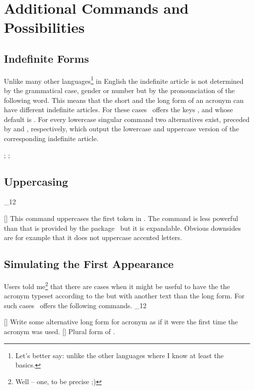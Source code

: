 \documentclass[load-preamble+,scrartcl={DIV10}]{cnltx-doc}
\makeatletter
\renewenvironment{commands}
  {%
    \cnltx@set@catcode_{12}%
    \let\command\cnltx@command
    \cnltxlist
  }
  {\endcnltxlist}
\makeatother
\begin{document}
\section{Additional Commands and Possibilities}
\subsection{Indefinite Forms}
\noindent{}%
Unlike many other languages\footnote{Let's better say: unlike the other
  languages where I know at least the basics.} in English the indefinite
article is not determined by the grammatical case, gender or number but by the
pronounciation of the following word.  This means that the short and the long
form of an acronym can have different indefinite articles.  For these cases
\acro\ offers the keys ,  and
 whose default is .  For every lowercase
singular command two alternatives exist, preceded by  and ,
respectively, which output the lowercase and uppercase version of the
corresponding indefinite article.

\begin{example}
  ; ; 
\end{example}

\subsection{Uppercasing}
\begin{commands}
  \command{acfirstupper}[]
     This command uppercases the first token in .  The command is less powerful than  that is
     provided by the  package~\cite{pkg:mfirstuc} but it is
     expandable.  Obvious downsides are for example that it does not uppercase
     accented letters.
\end{commands}

\subsection{Simulating the First Appearance}
\noindent{}%
Users told me\footnote{Well -- one, to be precise ;)} that there are cases
when it might be useful to have the the acronym typeset according to the
 but with another text than the long form.  For such cases
\acro\ offers the following commands.
\begin{commands}
  \command{acflike}[\sarg{}]
    Write some alternative long form for acronym  as if it were the
    first time the acronym was used.
  \command{acfplike}[\sarg{}]
    Plural form of .
\end{commands}
\end{document}
